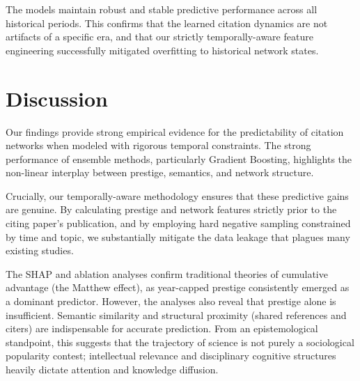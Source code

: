 \documentclass[12pt,a4paper]{article}
\begin{document}
\begin{table}[h!]
\centering
\caption{Gradient Boosting Performance Across Rolling Temporal Windows}
\label{tab:rolling}
\end{table}

The models maintain robust and stable predictive performance across all historical periods. This confirms that the learned citation dynamics are not artifacts of a specific era, and that our strictly temporally-aware feature engineering successfully mitigated overfitting to historical network states.

\section{Discussion}
Our findings provide strong empirical evidence for the predictability of citation networks when modeled with rigorous temporal constraints. The strong performance of ensemble methods, particularly Gradient Boosting, highlights the non-linear interplay between prestige, semantics, and network structure. 

Crucially, our temporally-aware methodology ensures that these predictive gains are genuine. By calculating prestige and network features strictly prior to the citing paper's publication, and by employing hard negative sampling constrained by time and topic, we substantially mitigate the data leakage that plagues many existing studies.

The SHAP and ablation analyses confirm traditional theories of cumulative advantage (the Matthew effect), as year-capped prestige consistently emerged as a dominant predictor. However, the analyses also reveal that prestige alone is insufficient. Semantic similarity and structural proximity (shared references and citers) are indispensable for accurate prediction. From an epistemological standpoint, this suggests that the trajectory of science is not purely a sociological popularity contest; intellectual relevance and disciplinary cognitive structures heavily dictate attention and knowledge diffusion.
\end{document}
